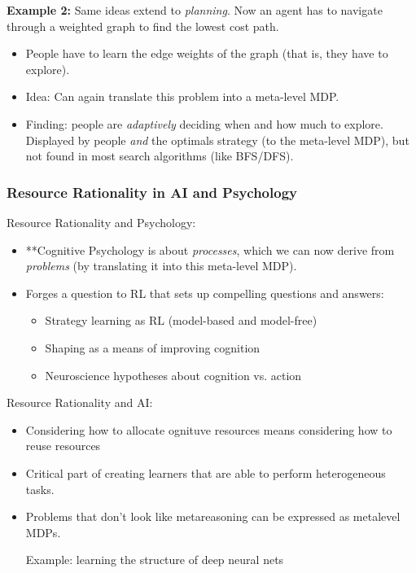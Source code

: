 {\bf Example 2:} Same ideas extend to {\it planning}. Now an agent has to navigate through a weighted graph to find the lowest cost path.
\begin{itemize}
    \item People have to learn the edge weights of the graph (that is, they have to explore).
    \item Idea: Can again translate this problem into a meta-level MDP.
    \item Finding: people are {\it adaptively} deciding when and how much to explore. Displayed by people {\it and} the optimals strategy (to the meta-level MDP), but not found in most search algorithms (like BFS/DFS).
\end{itemize}

\subsubsection{Resource Rationality in AI and Psychology}

Resource Rationality and Psychology:
\begin{itemize}
    \item **Cognitive Psychology is about {\it processes}, which we can now derive from {\it problems} (by translating it into this meta-level MDP).
    \item Forges a question to RL that sets up compelling questions and answers:
    \begin{itemize}
        \item Strategy learning as RL (model-based and model-free)
        \item Shaping as a means of improving cognition
        \item Neuroscience hypotheses about cognition vs. action
    \end{itemize}
\end{itemize}

Resource Rationality and AI:
\begin{itemize}
    \item Considering how to allocate ognituve resources means considering how to reuse resources
    \item Critical part of creating learners that are able to perform heterogeneous tasks.
    \item Problems that don't look like metareasoning can be expressed as metalevel MDPs.
    
    Example: learning the structure of deep neural nets~\cite{peterson2018evaluating}
\end{itemize}

